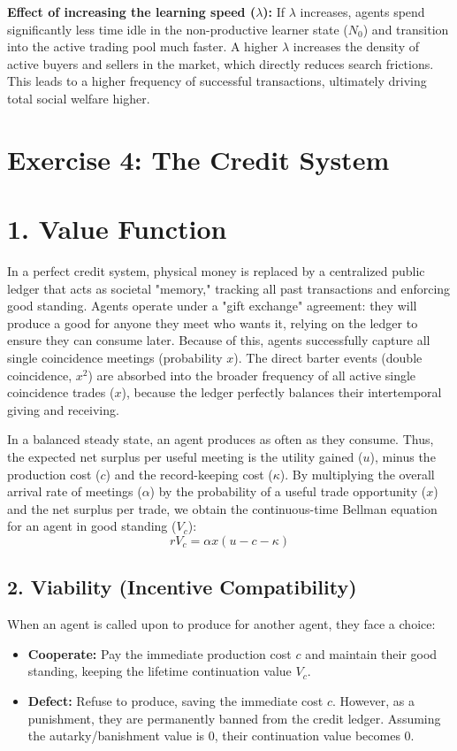 \documentclass[11pt, a4paper]{article}
\begin{document}
\textbf{Effect of increasing the learning speed ($\lambda$):} 
If $\lambda$ increases, agents spend significantly less time idle in the non-productive learner state ($N_0$) and transition into the active trading pool much faster. A higher $\lambda$ increases the density of active buyers and sellers in the market, which directly reduces search frictions. This leads to a higher frequency of successful transactions, ultimately driving total social welfare higher.

\section*{Exercise 4: The Credit System}

\section*{1. Value Function}
In a perfect credit system, physical money is replaced by a centralized public ledger that acts as societal "memory," tracking all past transactions and enforcing good standing. Agents operate under a "gift exchange" agreement: they will produce a good for anyone they meet who wants it, relying on the ledger to ensure they can consume later. Because of this, agents successfully capture all single coincidence meetings (probability $x$). The direct barter events (double coincidence, $x^2$) are absorbed into the broader frequency of all active single coincidence trades ($x$), because the ledger perfectly balances their intertemporal giving and receiving.

In a balanced steady state, an agent produces as often as they consume. Thus, the expected net surplus per useful meeting is the utility gained ($u$), minus the production cost ($c$) and the record-keeping cost ($\kappa$). By multiplying the overall arrival rate of meetings ($\alpha$) by the probability of a useful trade opportunity ($x$) and the net surplus per trade, we obtain the continuous-time Bellman equation for an agent in good standing ($V_c$):
\begin{equation}
    rV_c = \alpha x(u - c - \kappa)
\end{equation}

\subsection*{2. Viability (Incentive Compatibility)}

When an agent is called upon to produce for another agent, they face a choice:
\begin{itemize}
    \item \textbf{Cooperate:} Pay the immediate production cost $c$ and maintain their good standing, keeping the lifetime continuation value $V_c$.
    \item \textbf{Defect:} Refuse to produce, saving the immediate cost $c$. However, as a punishment, they are permanently banned from the credit ledger. Assuming the autarky/banishment value is $0$, their continuation value becomes $0$.
\end{itemize}
\end{document}
